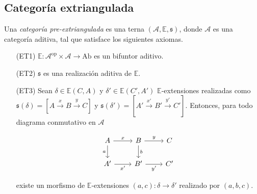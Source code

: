 \documentclass[tesis]{subfiles}
\begin{document}
\subsection*{Categoría extriangulada} \label{Ssec: Categoría extriangulada}

\begin{Def}\cite[Definition 2.12]{NakaokaPalu}\label{Def: Categoría extriangulada}
    Una \emph{categoría pre-extriangulada} es una terna $(\mathscr{A},\mathbb{E},\mathfrak{s})$, donde $\mathscr{A}$ es una categoría aditiva, tal que satisface los siguientes axiomas.

    \begin{itemize}
    
        \item[(ET1)] $\mathbb{E}:\mathscr{A}^\text{op}\times\mathscr{A}\to \text{Ab}$ es un bifuntor aditivo.

        \item[(ET2)] $\mathfrak{s}$ es una realización aditiva de $\mathbb{E}$.

        \item[(ET3)] Sean $\delta\in\mathbb{E}(C,A)$ y $\delta'\in\mathbb{E}(C',A')$ $\mathbb{E}$-extensiones realizadas como $\mathfrak{s}(\delta) = [A\xrightarrow[]{x} B\xrightarrow[]{y} C]$ y $\mathfrak{s}(\delta') = [A'\xrightarrow[]{x'} B'\xrightarrow[]{y'} C']$. Entonces, para todo diagrama conmutativo en $\mathscr{A}$
            \begin{center}
                \begin{equation}\label{eq: (ET3)}
                    \begin{tikzcd}
                        A \arrow[]{r}[]{x} \arrow[]{d}[swap]{a} &B \arrow[]{r}[]{y} \arrow[]{d}[]{b} &C \\
                        A' \arrow[]{r}[swap]{x'} &B' \arrow[]{r}[swap]{y'} &C'
                    \end{tikzcd}
                \end{equation}
            \end{center}
            existe un morfismo de $\mathbb{E}$-extensiones $(a,c):\delta\to \delta'$ realizado por $(a,b,c)$.
            

\end{itemize}
\end{Def}
\end{document}
